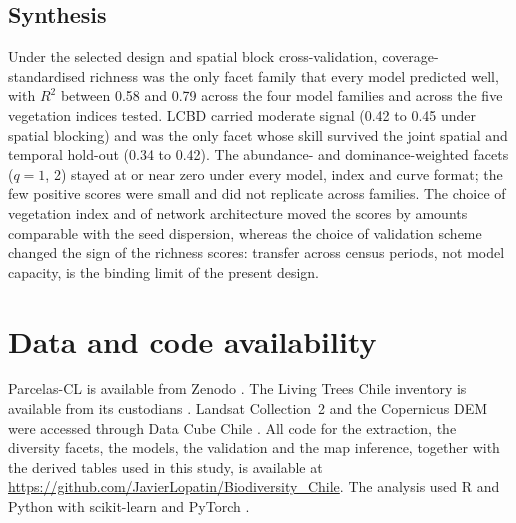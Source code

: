 \documentclass[preprint,12pt]{elsarticle}
\begin{document}
\subsection{Synthesis}

Under the selected design and spatial block cross-validation, coverage-standardised
richness was the only facet family that every model predicted well, with $R^2$ between
0.58 and 0.79 across the four model families and across the five vegetation indices
tested. LCBD carried
moderate signal (0.42 to 0.45 under spatial blocking) and was the only facet whose skill
survived the joint spatial and temporal hold-out (0.34 to 0.42). The abundance- and
dominance-weighted facets ($q = 1$, 2) stayed at or near zero under every model, index and
curve format; the few positive scores were small and did not replicate across families.
The choice of vegetation index and of network architecture moved the scores by amounts
comparable with the seed dispersion, whereas the choice of validation scheme changed the
sign of the richness scores: transfer across census periods, not model capacity, is the
binding limit of the present design.

\section*{Data and code availability}

\begin{sloppypar}
Parcelas-CL is available from Zenodo \citep{zenodo2026parcelascl}. The Living Trees Chile
inventory is available from its custodians \citep{livingtrees_chile}. Landsat Collection~2
and the Copernicus DEM were accessed through Data Cube Chile \citep{datacubechile}. All
code for the extraction, the diversity facets, the models, the validation and the map
inference, together with the derived tables used in this study, is available at
\url{https://github.com/JavierLopatin/Biodiversity_Chile}. The analysis used R
\citep{rcoreteam2026r} and Python with scikit-learn \citep{pedregosa2011scikit} and
PyTorch \citep{paszke2019pytorch}.
\end{sloppypar}



\end{document}
